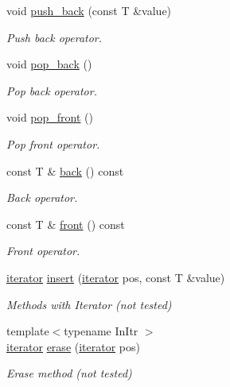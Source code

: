\begin{DoxyCompactItemize}
void \hyperlink{classsc_1_1list_a1d77cdaeacca7959989873617a753c96}{push\+\_\+back} (const T \&value)
\begin{DoxyCompactList}\small\item\em Push back operator. \end{DoxyCompactList}\item 
void \hyperlink{classsc_1_1list_a3d6fc0a4f2c1db7c74af5a482c1a03ca}{pop\+\_\+back} ()
\begin{DoxyCompactList}\small\item\em Pop back operator. \end{DoxyCompactList}\item 
void \hyperlink{classsc_1_1list_ab3fbf66643f4356cf0c1947bd4fdf48e}{pop\+\_\+front} ()
\begin{DoxyCompactList}\small\item\em Pop front operator. \end{DoxyCompactList}\item 
const T \& \hyperlink{classsc_1_1list_a4835abb7fb3362c357d534db60e0ba6e}{back} () const
\begin{DoxyCompactList}\small\item\em Back operator. \end{DoxyCompactList}\item 
const T \& \hyperlink{classsc_1_1list_a5e27dee267cd155aaeb87698a2f63da5}{front} () const
\begin{DoxyCompactList}\small\item\em Front operator. \end{DoxyCompactList}\item 
\hyperlink{classsc_1_1list_1_1iterator}{iterator} \hyperlink{classsc_1_1list_a06b47c35531035c93c34d20b39277c99}{insert} (\hyperlink{classsc_1_1list_1_1iterator}{iterator} pos, const T \&value)
\begin{DoxyCompactList}\small\item\em Methods with Iterator (not tested) \end{DoxyCompactList}\item 
{\footnotesize template$<$typename In\+Itr $>$ }\\\hyperlink{classsc_1_1list_1_1iterator}{iterator} \hyperlink{classsc_1_1list_a1bc9bb828cea4b1d35cd9f00adef6387}{erase} (\hyperlink{classsc_1_1list_1_1iterator}{iterator} pos)
\begin{DoxyCompactList}\small\item\em Erase method (not tested) \end{DoxyCompactList}\end{DoxyCompactItemize}
